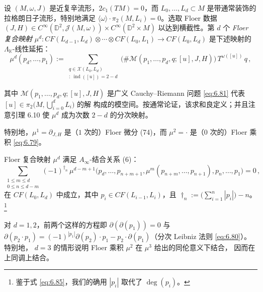 \begin{Def}\label{def:6.11}
设 $(M,\omega,J)$ 是近复辛流形，$2c_1(TM)=0$，而 $L_0,\dots,L_d\subset M$
是带通常装饰的拉格朗日子流形，特别地满足
$\langle\omega\rangle\cdot\pi_2(M,L_i)=0$。选取 Floer 数据
$(J,H)\in C^\infty(\mathbb D^2,\mathcal J(M,\omega))\times
C^\infty(\mathbb D^2\times M)$ 以达到横截性。第 $d$ 个 \emph{Floer 复合映射}
$\mu^d:CF(L_{d-1},L_d)\otimes\cdots\otimes CF(L_0,L_1)\to CF(L_0,L_d)$
是下述映射的 $\Lambda_{\mathbb K}$-线性延拓：
\begin{equation}
\mu^d(p_d,\dots,p_1):=\sum_{\substack{q\in\mathcal X(L_0,L_d)\\
[u]:\ \operatorname{ind}([u])=2-d}}
\bigl(\#\mathcal M(p_1,\dots,p_d,q;[u],J,H)\bigr)\,
T^{\omega([u])}\,q\,,
\label{eq:6.84}
\end{equation}
\end{Def}

其中 $\mathcal M(p_1,\dots,p_d,q;[u],J,H)$ 是广义 Cauchy--Riemann 问题
\eqref{eq:6.81} 代表 $[u]\in\pi_2\bigl(M,\bigcup_{i=0}^d L_i\bigr)$ 的解
构成的模空间。按通常论证，该求和良定义；并且注意引理 6.10 使 $\mu^d$
成为次数 $2-d$ 的分次映射。

特别地，$\mu^1=\partial_{J,H}$ 是（$1$ 次的）Floer 微分 (74)，而
$\mu^2=\cdot$ 是（$0$ 次的）Floer 乘积 \eqref{eq:6.79}。


\begin{Pro}\label{pro:6.12}
Floer 复合映射 $\mu^d$ 满足 $A_\infty$-结合关系 (6)：
\begin{equation}
\sum_{\substack{1\le m\le d\\ 0\le n\le d-m}}(-1)^{\dagger_n}\,
\mu^{d-m+1}\bigl(p_d,\dots,p_{n+m+1},
\mu^m(p_{n+m},\dots,p_{n+1}),p_n,\dots,p_1\bigr)=0\,,
\label{eq:6.85}
\end{equation}
在 $CF(L_0,L_d)$ 中成立，其中 $p_i\in CF(L_{i-1},L_i)$，且
$\dagger_n:=\bigl(\sum_{i=1}^{n}|p_i|\bigr)-n$。\footnote{鉴于式
\eqref{eq:6.85}，我们的确用 $|p_i|$ 取代了 $\deg(p_i)$。}
\end{Pro}

对 $d=1,2$，前两个这样的方程即 $\partial(\partial(p_1))=0$ 与
$\partial(p_2\cdot p_1)=(-1)^{|p_1|}\partial(p_2)\cdot p_1
-p_2\cdot\partial(p_1)$（分次 Leibniz 法则 \eqref{eq:6.80}）。特别地，
$d=3$ 的情形说明 Floer 乘积 $\mu^2$ 在 $\mu^3$ 给出的同伦意义下结合，
因而在上同调上结合。

